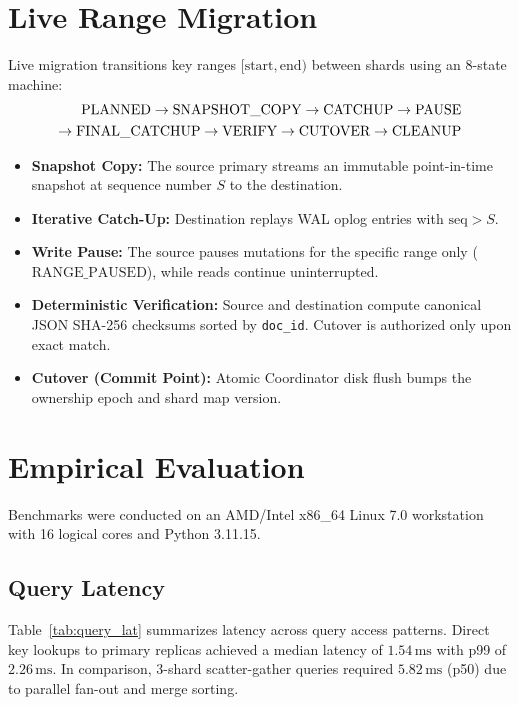 \documentclass[10pt,journal,compsoc]{IEEEtran}
\begin{document}
\section{Live Range Migration}

Live migration transitions key ranges $[\text{start}, \text{end})$ between shards using an 8-state machine:
\begin{align}
\text{PLANNED} \to \text{SNAPSHOT\_COPY} \to \text{CATCHUP} \to \text{PAUSE} \notag \\
\to \text{FINAL\_CATCHUP} \to \text{VERIFY} \to \text{CUTOVER} \to \text{CLEANUP}
\end{align}
\begin{itemize}
    \item \textbf{Snapshot Copy:} The source primary streams an immutable point-in-time snapshot at sequence number $S$ to the destination.
    \item \textbf{Iterative Catch-Up:} Destination replays WAL oplog entries with $\text{seq} > S$.
    \item \textbf{Write Pause:} The source pauses mutations for the specific range only ($\text{RANGE\_PAUSED}$), while reads continue uninterrupted.
    \item \textbf{Deterministic Verification:} Source and destination compute canonical JSON SHA-256 checksums sorted by \texttt{doc\_id}. Cutover is authorized only upon exact match.
    \item \textbf{Cutover (Commit Point):} Atomic Coordinator disk flush bumps the ownership epoch and shard map version.
\end{itemize}

\section{Empirical Evaluation}

Benchmarks were conducted on an AMD/Intel x86\_64 Linux 7.0 workstation with 16 logical cores and Python 3.11.15.

\subsection{Query Latency}
Table~\ref{tab:query_lat} summarizes latency across query access patterns. Direct key lookups to primary replicas achieved a median latency of $1.54\,\text{ms}$ with p99 of $2.26\,\text{ms}$. In comparison, 3-shard scatter-gather queries required $5.82\,\text{ms}$ (p50) due to parallel fan-out and merge sorting.
\end{document}
